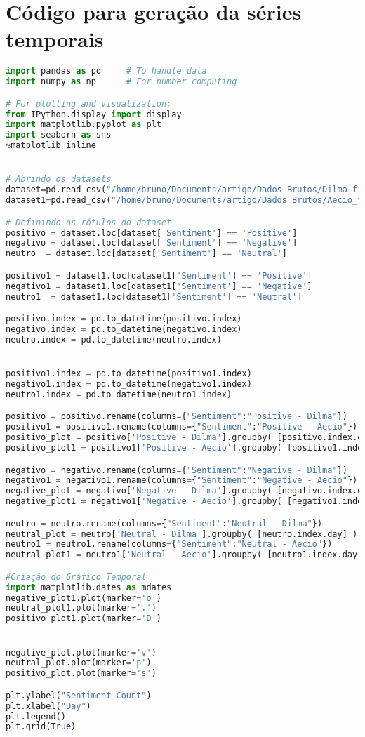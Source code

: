\section{Código para geração da séries temporais}
\label{cod:time}
\begin{lstlisting}[language=Python]
import pandas as pd     # To handle data
import numpy as np      # For number computing

# For plotting and visualization:
from IPython.display import display
import matplotlib.pyplot as plt
import seaborn as sns
%matplotlib inline


# Abrindo os datasets
dataset=pd.read_csv("/home/bruno/Documents/artigo/Dados Brutos/Dilma_final_prog1.csv",delimiter=",",encoding='latin-1').set_index('Date')
dataset1=pd.read_csv("/home/bruno/Documents/artigo/Dados Brutos/Aecio_final_prog1.csv",delimiter=",",encoding='latin-1').set_index('Date')

# Definindo os rótulos do dataset
positivo = dataset.loc[dataset['Sentiment'] == 'Positive']
negativo = dataset.loc[dataset['Sentiment'] == 'Negative']
neutro  = dataset.loc[dataset['Sentiment'] == 'Neutral']

positivo1 = dataset1.loc[dataset1['Sentiment'] == 'Positive']
negativo1 = dataset1.loc[dataset1['Sentiment'] == 'Negative']
neutro1  = dataset1.loc[dataset1['Sentiment'] == 'Neutral']

positivo.index = pd.to_datetime(positivo.index)
negativo.index = pd.to_datetime(negativo.index)
neutro.index = pd.to_datetime(neutro.index)


positivo1.index = pd.to_datetime(positivo1.index)
negativo1.index = pd.to_datetime(negativo1.index)
neutro1.index = pd.to_datetime(neutro1.index)

positivo = positivo.rename(columns={"Sentiment":"Positive - Dilma"})
positivo1 = positivo1.rename(columns={"Sentiment":"Positive - Aecio"})
positivo_plot = positivo['Positive - Dilma'].groupby( [positivo.index.day] ).count()
positivo_plot1 = positivo1['Positive - Aecio'].groupby( [positivo1.index.day] ).count()

negativo = negativo.rename(columns={"Sentiment":"Negative - Dilma"})
negativo1 = negativo1.rename(columns={"Sentiment":"Negative - Aecio"})
negative_plot = negativo['Negative - Dilma'].groupby( [negativo.index.day] ).count()
negative_plot1 = negativo1['Negative - Aecio'].groupby( [negativo1.index.day] ).count()

neutro = neutro.rename(columns={"Sentiment":"Neutral - Dilma"})
neutral_plot = neutro['Neutral - Dilma'].groupby( [neutro.index.day] ).count()
neutro1 = neutro1.rename(columns={"Sentiment":"Neutral - Aecio"})
neutral_plot1 = neutro1['Neutral - Aecio'].groupby( [neutro1.index.day] ).count()

#Criação do Gráfico Temporal
import matplotlib.dates as mdates
negative_plot1.plot(marker='o')
neutral_plot1.plot(marker='.')
positivo_plot1.plot(marker='D')


negative_plot.plot(marker='v')
neutral_plot.plot(marker='p')
positivo_plot.plot(marker='s')

plt.ylabel("Sentiment Count")
plt.xlabel("Day")
plt.legend()
plt.grid(True)

\end{lstlisting}



